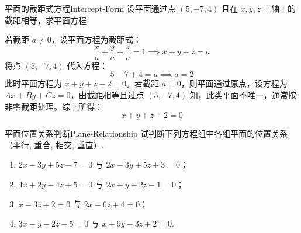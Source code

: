 \begin{problem}{平面的截距式方程}{Intercept-Form}
    设平面通过点 $(5, -7, 4)$ 且在 $x, y, z$ 三轴上的截距相等，求平面方程.
\end{problem}

\begin{solution}
    若截距 $a \neq 0$，设平面方程为截距式：
    \begin{equation*}
        \frac{x}{a} + \frac{y}{a} + \frac{z}{a} = 1 \implies x + y + z = a
    \end{equation*}
    将点 $(5, -7, 4)$ 代入方程：
    \begin{equation*}
        5 - 7 + 4 = a \implies a = 2
    \end{equation*}
    此时平面方程为 $x + y + z - 2 = 0$。若截距 $a = 0$，则平面通过原点，设方程为 $Ax + By + Cz = 0$，由截距相等且过点 $(5, -7, 4)$ 知，此类平面不唯一，通常按非零截距处理。综上所得：
    \begin{equation*}
        \boxed{x + y + z - 2 = 0}
    \end{equation*}
\end{solution}

\begin{problem}{平面位置关系判断}{Plane-Relationship}
    试判断下列方程组中各组平面的位置关系（平行, 重合, 相交, 垂直）.
    \begin{enumerate}
        \item $2x - 3y + 5z - 7 = 0$ 与 $2x - 3y + 5z + 3 = 0$；
        \item $4x + 2y - 4z + 5 = 0$ 与 $2x + y + 2z - 1 = 0$；
        \item $x - 3z + 2 = 0$ 与 $2x - 6z + 4 = 0$；
        \item $3x - y - 2z - 5 = 0$ 与 $x + 9y - 3z + 2 = 0$.
    \end{enumerate}
\end{problem}

